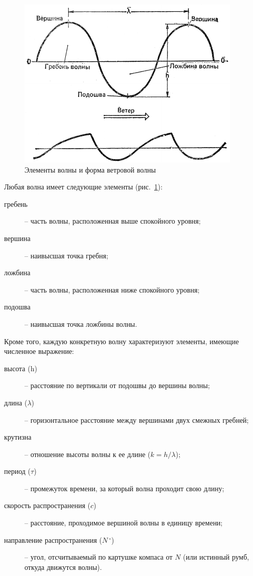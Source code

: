 \documentclass[a4paper, 12pt, twoside, final, book, russian, fittopage, cyremdash]{ncc}
\newcommand{\gr}{\ensuremath{\,^\circ}\xspace}
\newcommand{\ris}[1]{\ref{fig:#1}}
\begin{document}
\begin{figure}[htb]
  \centering{}
  \includegraphics[scale=1.2]{0124P}
  \caption{Элементы волны и форма ветровой волны}
  \label{fig:124}
\end{figure}

Любая волна имеет следующие элементы (рис.~\ris{124}):
\begin{description}
\item[гребень] \--- часть волны, расположенная выше спокойного уровня;
\item[вершина] \--- наивысшая точка гребня;
\item[ложбина] \--- часть волны, расположенная ниже спокойного уровня;
\item[подошва] \--- наивысшая точка ложбины волны.
\end{description}

Кроме того, каждую конкретную волну характеризуют элементы, имеющие численное выражение:
\begin{description}
\item[высота (h)] \--- расстояние по вертикали от подошвы до вершины волны;
\item[длина ($\lambda$)] \--- горизонтальное расстояние между вершинами двух смежных гребней;
\item[крутизна] \--- отношение высоты волны к ее длине ($k = h / \lambda$);
\item[период ($\tau$)] \--- промежуток времени, за который волна проходит свою длину;
\item[скорость распространения ($c$)] \--- расстояние, проходимое вершиной волны в единицу времени;
\item[направление распространения ($N\gr$)] \--- угол, отсчитываемый по картушке компаса от $N$ (или истинный румб, откуда движутся волны).
\end{description}
\end{document}
